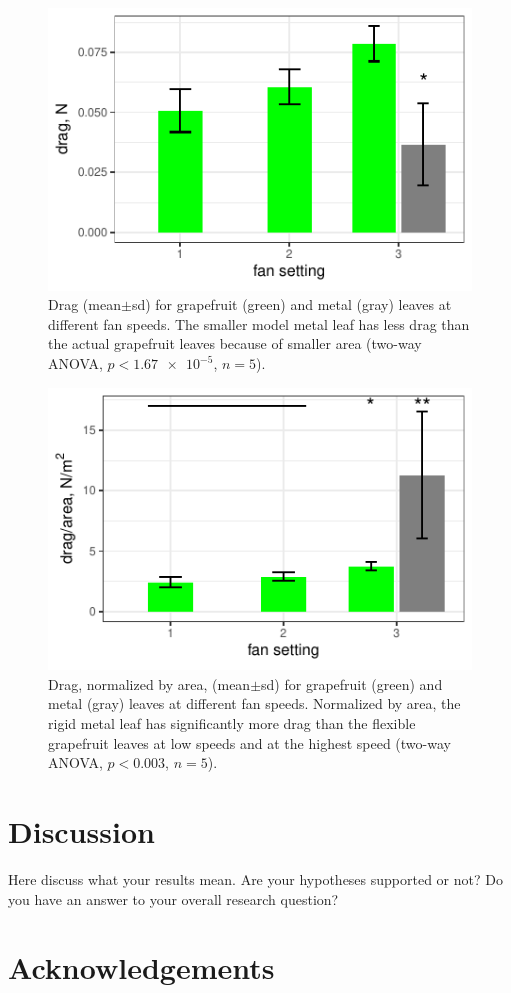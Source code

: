 \documentclass{article}
\begin{document}
\begin{figure}
\begin{center}
\includegraphics{data/results1.pdf}
\end{center}
\caption{Drag (mean$\pm$sd) for grapefruit (green) and metal (gray) leaves at different fan speeds. The smaller model metal leaf has less drag than the actual grapefruit leaves because of smaller area (two-way ANOVA, $p<\num{1.67e-5}$, $n=5$).}
\label{fig:results1}
\end{figure}

\begin{figure}
\begin{center}
\includegraphics{data/results2.pdf}
\end{center}
\caption{Drag, normalized by area, (mean$\pm$sd) for grapefruit (green) and metal (gray) leaves at different fan speeds. Normalized by area, the rigid metal leaf has significantly more drag than the flexible grapefruit leaves at low speeds and at the highest speed (two-way ANOVA, $p<0.003$, $n=5$).}
\label{fig:results2}
\end{figure}


\section{Discussion}
Here discuss what your results mean. Are your hypotheses supported or not? Do you have an answer to your overall research question?

\section{Acknowledgements}


\end{document}
